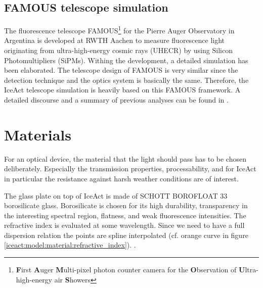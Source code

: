 \subsection{FAMOUS telescope simulation}
The fluorescence telescope FAMOUS\footnote{\textbf{F}irst \textbf{A}uger \textbf{M}ulti-pixel
photon counter camera for the \textbf{O}bservation of \textbf{U}ltra-high-energy air \textbf{S}howers} for the Pierre Auger Observatory in Argentina is developed at RWTH Aachen to measure fluorescence light originating from ultra-high-energy cosmic rays (UHECR) by using Silicon Photomultipliers (SiPMs). Withing the development, a detailed \geant simulation has been elaborated. \cite{famous:sim_github,famous:sim_github} The telescope design of FAMOUS is very similar since the detection technique and the optics system is basically the same. Therefore, the IceAct telescope simulation is heavily based on this FAMOUS \geant framework. A detailed discourse and a summary of previous analyses can be found in \cite{famous:niggemann}.

\section{Materials}\label{sec:iceact:model:material}

For an optical device, the material that the light should pass has to be chosen deliberately. Especially the transmission properties, processability, and for IceAct in particular the resistance against harsh weather conditions are of interest.

The glass plate on top of IceAct is made of SCHOTT BOROFLOAT\textsuperscript{\textregistered} 33 borosilicate glass. Borosilicate is chosen for its high durability, transparency in the interesting spectral region, flatness, and weak fluorescence intensities. The refractive index is evaluated at some wavelength. Since we need to have a full dispersion relation the points are spline interpolated (cf. orange curve in figure \ref{iceact:model:material:refractive_index}). \cite{iceact:borosilicate:datasheet}. 

